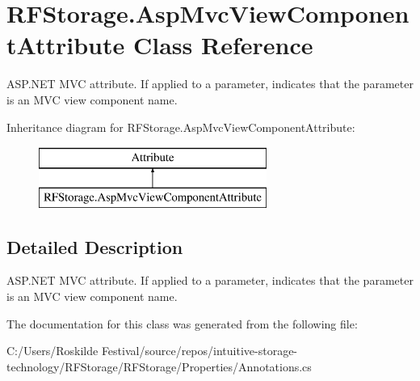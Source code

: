 \section{R\+F\+Storage.\+Asp\+Mvc\+View\+Component\+Attribute Class Reference}
\label{class_r_f_storage_1_1_asp_mvc_view_component_attribute}


A\+S\+P.\+N\+ET M\+VC attribute. If applied to a parameter, indicates that the parameter is an M\+VC view component name.  


Inheritance diagram for R\+F\+Storage.\+Asp\+Mvc\+View\+Component\+Attribute\+:\begin{figure}[H]
\begin{center}
\leavevmode
\includegraphics[height=2.000000cm]{class_r_f_storage_1_1_asp_mvc_view_component_attribute}
\end{center}
\end{figure}


\subsection{Detailed Description}
A\+S\+P.\+N\+ET M\+VC attribute. If applied to a parameter, indicates that the parameter is an M\+VC view component name. 



The documentation for this class was generated from the following file\+:\begin{DoxyCompactItemize}
\item 
C\+:/\+Users/\+Roskilde Festival/source/repos/intuitive-\/storage-\/technology/\+R\+F\+Storage/\+R\+F\+Storage/\+Properties/Annotations.\+cs\end{DoxyCompactItemize}
